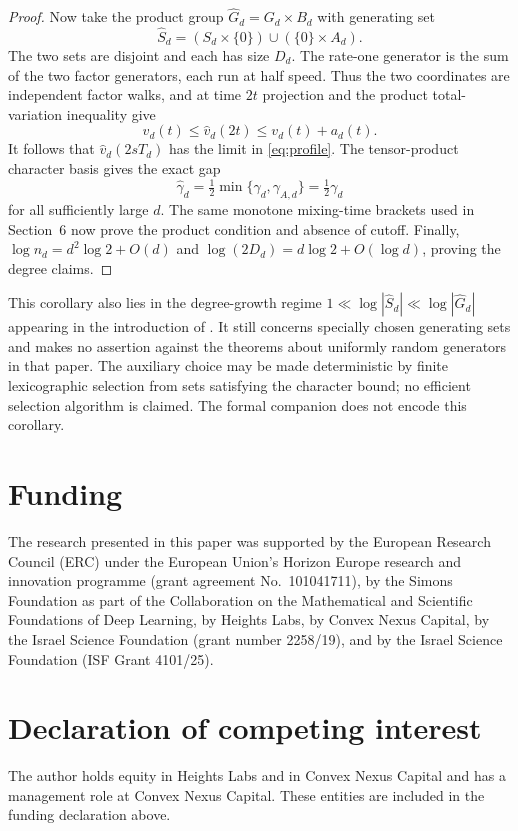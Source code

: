 \documentclass[11pt]{article}
\theoremstyle{remark}\newtheorem{remark}[theorem]{Remark}
\begin{document}
\begin{proof}
Now take the product group $\widehat G_d=G_d\times B_d$ with generating set
\[
 \widehat S_d=(S_d\times\{0\})\cup(\{0\}\times A_d).
\]
The two sets are disjoint and each has size $D_d$. The rate-one generator is the sum of the two factor generators, each run at half speed. Thus the two coordinates are independent factor walks, and at time $2t$ projection and the product total-variation inequality give
\[
 v_d(t)\le\widehat v_d(2t)\le v_d(t)+a_d(t).
\]
It follows that $\widehat v_d(2sT_d)$ has the limit in \eqref{eq:profile}. The tensor-product character basis gives the exact gap
\[
 \widehat\gamma_d=\tfrac12\min\{\gamma_d,\gamma_{A,d}\}
 =\tfrac12\gamma_d
\]
for all sufficiently large $d$. The same monotone mixing-time brackets used in Section~6 now prove the product condition and absence of cutoff. Finally,
$\log n_d=d^2\log2+O(d)$ and $\log(2D_d)=d\log2+O(\log d)$, proving the degree claims.
\end{proof}

This corollary also lies in the degree-growth regime $1\ll\log|\widehat S_d|\ll\log|\widehat G_d|$ appearing in the introduction of \cite{HOT}. It still concerns specially chosen generating sets and makes no assertion against the theorems about uniformly random generators in that paper. The auxiliary choice may be made deterministic by finite lexicographic selection from sets satisfying the character bound; no efficient selection algorithm is claimed. The formal companion does not encode this corollary.

\section*{Funding}
The research presented in this paper was supported by the European Research Council (ERC) under the European Union's Horizon Europe research and innovation programme (grant agreement No.~101041711), by the Simons Foundation as part of the Collaboration on the Mathematical and Scientific Foundations of Deep Learning, by Heights Labs, by Convex Nexus Capital, by the Israel Science Foundation (grant number 2258/19), and by the Israel Science Foundation (ISF Grant 4101/25).

\section*{Declaration of competing interest}
The author holds equity in Heights Labs and in Convex Nexus Capital and has a management role at Convex Nexus Capital. These entities are included in the funding declaration above.
\end{document}
